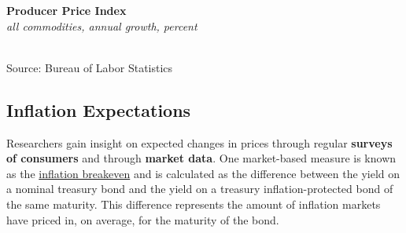 \documentclass{report}
\makeatletter
\newcommand{\tbllink}[1]{\href{https://raw.githubusercontent.com/bdecon/US-chartbook/master/chartbook/data/#1}{\faTable}}
\newcommand*\short[1]{\expandafter\@gobbletwo\number\numexpr#1\relax}
\newcommand{\dateaxisticks}{
		date coordinates in=x, axis line style={draw=none},
		xmax={2021-05-15},
		max space between ticks=40,	    
		xtick={{1990-01-01}, {1992-01-01}, {1994-01-01}, 
			{1996-01-01}, {1998-01-01}, {2000-01-01}, 
			{2002-01-01}, {2004-01-01}, {2006-01-01},
			{2008-01-01}, {2010-01-01}, {2012-01-01}, {2014-01-01},
		    {2016-01-01}, {2018-01-01}, {2020-01-01}},
		minor xtick={{1989-01-01}, {1991-01-01}, {1993-01-01},
			{1995-01-01}, {1997-01-01}, {1999-01-01}, 
			{2001-01-01}, {2003-01-01}, {2005-01-01}, {2007-01-01},
		    {2009-01-01}, {2011-01-01}, {2013-01-01}, {2015-01-01},
		    {2017-01-01}, {2019-01-01}, {2021-01-01}},
		enlarge y limits={0.06}, enlarge x limits={0.01},
		}
\newcommand{\bbar}[2]{extra #1 ticks = {{#2}}, extra #1 tick labels = ,
		extra #1 tick style = {grid=major, grid style={thick, black!25}},}
\newcommand{\stdline}[4]{\addplot[very thick, no markers, color=#1] 
		table [x=#2, y=#3, col sep=comma] {#4};	}
\newcommand{\rbars}{
		\fill[color=black!10] (axis cs:{1990-07-01},\pgfkeysvalueof{/pgfplots/ymin}) rectangle 
			(axis cs:{1991-03-01}, \pgfkeysvalueof{/pgfplots/ymax});
		\fill[color=black!10] (axis cs:{2007-12-01},\pgfkeysvalueof{/pgfplots/ymin}) rectangle 
			(axis cs:{2009-07-01}, \pgfkeysvalueof{/pgfplots/ymax});
		\fill[color=black!10] (axis cs:{2001-03-01},\pgfkeysvalueof{/pgfplots/ymin}) rectangle 
			(axis cs:{2001-11-01}, \pgfkeysvalueof{/pgfplots/ymax});
		\fill[color=black!10] (axis cs:{2020-02-01},\pgfkeysvalueof{/pgfplots/ymin}) rectangle 
			(axis cs:{2021-05-15}, \pgfkeysvalueof{/pgfplots/ymax});}
\makeatother
\begin{document}
{{\begin{minipage}{0.47\textwidth}
\normalsize \textbf{Producer Price Index}\\
\footnotesize{\textit{all commodities, annual growth, percent}}\\
\hspace*{-2mm} \\
\footnotesize{Source: Bureau of Labor Statistics} \hfill \tbllink{ppi.csv}
\end{minipage} \hspace{6mm} 
\begin{minipage}{0.24\textwidth}
\small 
\end{minipage}
\vspace{2mm}

\subsection*{\color{black!70} \seriffont Inflation Expectations}
\begin{minipage}{0.76\textwidth}
\small Researchers gain insight on expected changes in prices through regular \textbf{surveys of consumers} and through \textbf{market data}. One market-based measure is known as the \href{https://fred.stlouisfed.org/series/T5YIE}{inflation breakeven} and is calculated as the difference between the yield on a nominal treasury bond and the yield on a treasury inflation-protected bond of the same maturity. This difference represents the amount of inflation markets have priced in, on average, for the maturity of the bond.
\end{minipage}

}}
\end{document}

